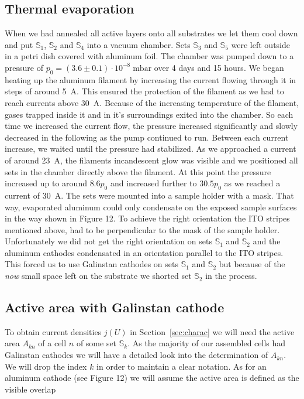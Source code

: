 \documentclass[a4paper,10pt,twocolumn]{article}
\begin{document}
\begin{extract*}
\subsection{Thermal evaporation}
When we had annealed all active layers onto all substrates we let them cool down and put $\mathbb{S}_1$, $\mathbb{S}_2$ and $\mathbb{S}_4$ into a vacuum chamber. Sets $\mathbb{S}_3$ and $\mathbb{S}_5$ were left outside in a petri dish covered with aluminum foil. The chamber was pumped down to a pressure of $p_0 = (3.6\pm 0.1)\cdot 10^{-8}\; \mathrm{mbar}$ over 4 days and 15 hours.\mypar
We began heating up the aluminum filament by increasing the current flowing through it in steps of around 5~A. This ensured the protection of the filament as we had to reach currents above 30~A. Because of the increasing temperature of the filament, gases trapped inside it and in it's surroundings exited into the chamber. So each time we increased the current flow, the pressure increased significantly and slowly decreased in the following as the pump continued to run. Between each current increase, we waited until the pressure had stabilized. As we approached a current of around 23~A, the filaments incandescent glow was visible and we positioned all sets in the chamber directly above the filament. At this point the pressure increased up to around $8.6p_0$ and increased further to $30.5p_0$ as we reached a current of 30~A.\mypar
The sets were mounted into a sample holder with a mask. That way, evaporated aluminum could only condensate on the exposed sample surfaces in the way shown in \cite{labdesc} Figure 12. To achieve the right orientation the ITO stripes mentioned above, had to be perpendicular to the mask of the sample holder. Unfortunately we did not get the right orientation on sets $\mathbb{S}_1$ and $\mathbb{S}_2$ and the aluminum cathodes condensated in an orientation parallel to the ITO stripes. This forced us to use Galinstan cathodes on sets $\mathbb{S}_1$ and $\mathbb{S}_2$ but because of the \emph{now} small space left on the substrate we shorted set $\mathbb{S}_2$ in the process.

\subsection{Active area with Galinstan cathode}

To obtain current densities $j(U)$ in Section~\ref{sec:charac} we will need the active area $A_{kn}$ of a cell $n$ of some set $\mathbb{S}_k$. As the majority of our assembled cells had Galinstan cathodes we will have a detailed look into the determination of $A_{kn}$. We will drop the index $k$ in order to maintain a clear notation.\mypar
As for an aluminum cathode (see \cite{labdesc} Figure 12) we will assume the active area is defined as the visible overlap 


\end{extract*}
\end{document}
